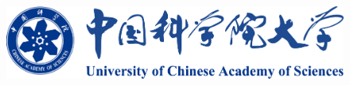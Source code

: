 \documentclass{article}
\begin{document}
\begin{figure}[H]  %
    \centering
    \includegraphics[width=0.5\linewidth]{images/title/ucas_logo 1.pdf}
    \label{fig:ucas-logo}
\end{figure}


\end{document}
